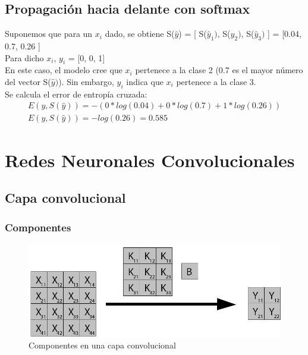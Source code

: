 \subsection{Propagación hacia delante con softmax}

Suponemos que para un $x_i$ dado, se obtiene S($\hat{y}$) = [ S($\hat{y}_1)$, S($\hat{y}_2)$, S($\hat{y}_3)$ ] = [0.04, 0.7, 0.26 ] \\
Para dicho $x_i$, $y_i$ = [0, 0, 1] \\
En este caso, el modelo cree que $x_i$ pertenece a la clase 2 (0.7 es el mayor número del vector S($\hat{y})$). Sin embargo, $y_i$ indica que $x_i$ pertenece a la clase 3. \\

Se calcula el error de entropía cruzada: \\

\begin{gather}
	 E(y, S(\hat{y})) = - (0*log(0.04) + 0*log(0.7) + 1*log(0.26)) \\
	 E(y, S(\hat{y})) = -log(0.26) = 0.585
\end{gather}

\cite{Cross_entropy_backprop}

\section{Redes Neuronales Convolucionales}

\subsection{Capa convolucional}

\subsubsection{Componentes}


\begin{figure}[H]
	\centering
	\includegraphics[scale=0.35]{imagenes/conv_nombres.jpg}  
	\caption{Componentes en una capa convolucional}
	\label{fig:Componentes_convolucion}
\end{figure}

